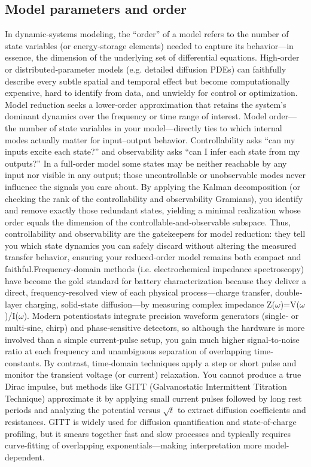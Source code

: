 \subsection{Model parameters and order}
In dynamic‐systems modeling, the “order” of a model refers to the number of state variables (or energy‐storage elements) needed to capture its behavior—in essence, the dimension of the underlying set of differential equations. High‐order or distributed‐parameter models (e.g. detailed diffusion PDEs) can faithfully describe every subtle spatial and temporal effect but become computationally expensive, hard to identify from data, and unwieldy for control or optimization. Model reduction seeks a lower‐order approximation that retains the system’s dominant dynamics over the frequency or time range of interest.
Model order—the number of state variables in your model—directly ties to which internal modes actually matter for input–output behavior. Controllability asks “can my inputs excite each state?” and observability asks “can I infer each state from my outputs?” In a full‐order model some states may be neither reachable by any input nor visible in any output; those uncontrollable or unobservable modes never influence the signals you care about. By applying the Kalman decomposition (or checking the rank of the controllability and observability Gramians), you identify and remove exactly those redundant states, yielding a minimal realization whose order equals the dimension of the controllable‐and‐observable subspace. Thus, controllability and observability are the gatekeepers for model reduction: they tell you which state dynamics you can safely discard without altering the measured transfer behavior, ensuring your reduced‐order model remains both compact and faithful.Frequency‐domain methods (i.e. electrochemical impedance spectroscopy) have become the gold standard for battery characterization because they deliver a direct, frequency‐resolved view of each physical process—charge transfer, double‐layer charging, solid‐state diffusion—by measuring complex impedance Z($\omega$)=V($\omega$)/I($\omega$). Modern potentiostats integrate precision waveform generators (single‐ or multi‐sine, chirp) and phase‐sensitive detectors, so although the hardware is more involved than a simple current‐pulse setup, you gain much higher signal-to-noise ratio at each frequency and unambiguous separation of overlapping time‐constants.
By contrast, time‐domain techniques apply a step or short pulse and monitor the transient voltage (or current) relaxation. You cannot produce a true Dirac impulse, but methods like GITT (Galvanostatic Intermittent Titration Technique) approximate it by applying small current pulses followed by long rest periods and analyzing the potential versus $\sqrt{t}$ to extract diffusion coefficients and resistances. GITT is widely used for diffusion quantification and state‐of‐charge profiling, but it smears together fast and slow processes and typically requires curve-fitting of overlapping exponentials—making interpretation more model-dependent.
